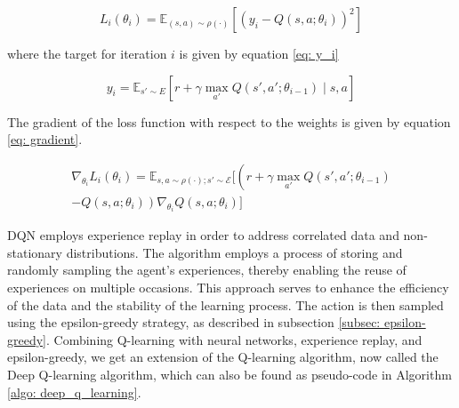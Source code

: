 \begin{equation} \label{eq: loss_function}
    L_i(\theta_i) = \mathbb{E}_{(s,a) \sim \rho(\cdot)} \left[ \left( y_i - Q(s, a; \theta_i) \right)^2 \right]
\end{equation}

where the target for iteration $i$ is given by equation \ref{eq: y_i}

\begin{equation} \label{eq: y_i}
    y_i = \mathbb{E}_{s' \sim E} \left[ r + \gamma \max_{a'} Q(s', a'; \theta_{i-1}) \mid s, a \right]
\end{equation}

The gradient of the loss function with respect to the weights is given by equation \ref{eq: gradient}.

\begin{equation}
\label{eq: gradient}
\begin{aligned}
\nabla_{\theta_i} L_i(\theta_i) = \mathbb{E}_{s, a \sim \rho(\cdot); s' \sim \mathcal{E}} \Bigg[ \left( r + \gamma \max_{a'} Q(s', a'; \theta_{i-1}) \right. \\
\left. - Q(s, a; \theta_i) \right) \nabla_{\theta_i} Q(s, a; \theta_i) \Bigg]
\end{aligned}
\end{equation}

\begin{comment}
\begin{equation}
    \nabla_{\theta_i} L_i(\theta_i) = \mathbb{E}_{(s,a) \sim \rho(\cdot); s' \sim E} \left[ \left( r + \gamma \max_{a'} Q(s', a'; \theta_{i-1}) - Q(s, a; \theta_i) \right) \nabla_{\theta_i} Q(s, a; \theta_i) \right]
\end{equation}
\end{comment}

DQN employs experience replay in order to address correlated data and non-stationary distributions. The algorithm employs a process of storing and randomly sampling the agent’s experiences, thereby enabling the reuse of experiences on multiple occasions. This approach serves to enhance the efficiency of the data and the stability of the learning process. The action is then sampled using the epsilon-greedy strategy, as described in subsection \ref{subsec: epsilon-greedy}. 
Combining Q-learning with neural networks, experience replay, and epsilon-greedy, we get an extension of the Q-learning algorithm, now called the Deep Q-learning algorithm, which can also be found as pseudo-code in Algorithm \ref{algo: deep_q_learning}.


